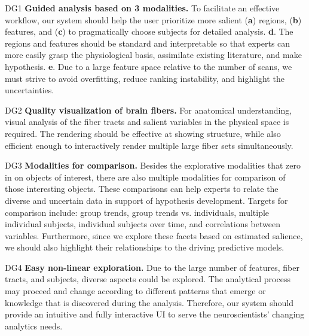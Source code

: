\begin{asparadesc}
    \item[DG1] \textbf{Guided analysis based on 3 modalities.}
   To facilitate an effective workflow, our system should help the user prioritize more salient (\textbf{a}) regions, (\textbf{b}) features, and (\textbf{c}) to pragmatically choose subjects for detailed analysis. \textbf{d}. The regions and features should be standard and interpretable so that experts can more easily grasp the physiological basis, assimilate existing literature, and make hypothesis. \textbf{e}. Due to a large feature space relative to the number of scans, we must strive to avoid overfitting, reduce ranking instability, and highlight the uncertainties.
    

	\item[DG2] \textbf{Quality visualization of brain fibers.}
	For anatomical understanding, visual analysis of the fiber tracts and salient variables in the physical space is required. The rendering should be effective at showing structure, while also efficient enough to interactively render multiple large fiber sets simultaneously.
	
	\item[DG3] \textbf{Modalities for comparison.} Besides the explorative modalities that zero in on objects of interest, there are also multiple modalities for comparison of those interesting objects. These comparisons can help experts to relate the diverse and uncertain data in support of hypothesis development. 
	Targets for comparison include: group trends, group trends vs. individuals, multiple individual subjects, individual subjects over time, and correlations between variables. Furthermore, since we explore these facets based on estimated salience, we should also highlight their relationships to the driving predictive models. 

    \item[DG4] \textbf{Easy non-linear exploration.}
    Due to the large number of features, fiber tracts, and subjects, 
    diverse aspects could be explored. 
    The analytical process may proceed and change according to different patterns that emerge or knowledge that is discovered during the analysis. 
    Therefore, our system should provide an intuitive and fully interactive UI to serve the neuroscientists' changing analytics needs.


\end{asparadesc}
